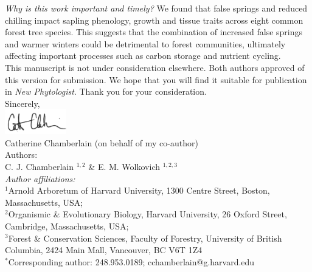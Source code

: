 \documentclass[11pt,a4paper]{article}\usepackage[]{graphicx}\usepackage[]{color}
\begin{document}
\noindent \textit{Why is this work important and timely?} We found that false springs and reduced chilling impact sapling phenology, growth and tissue traits across eight common forest tree species. This suggests that the combination of increased false springs and warmer winters could be detrimental to forest communities, ultimately affecting important processes such as carbon storage and nutrient cycling. \\

\noindent This manuscript is not under consideration elsewhere. Both authors approved of this version for submission. We hope that you will find it suitable for publication in \textit{New Phytologist}. Thank you for your consideration. \\

\vspace{1.5ex}
\noindent Sincerely, \\
\includegraphics[width=0.2\textwidth]{full_signature.jpg} \\
\noindent Catherine Chamberlain (on behalf of my co-author)
\vspace{2ex}\\
\noindent Authors:\\
C. J. Chamberlain $^{1,2}$ \& E. M. Wolkovich $^{1,2,3}$
\vspace{2ex}\\
\emph{Author affiliations:}\\
$^{1}$Arnold Arboretum of Harvard University, 1300 Centre Street, Boston, Massachusetts, USA; \\
$^{2}$Organismic \& Evolutionary Biology, Harvard University, 26 Oxford Street, Cambridge, Massachusetts, USA; \\
$^{3}$Forest \& Conservation Sciences, Faculty of Forestry, University of British Columbia, 2424 Main Mall, Vancouver, BC V6T 1Z4\\
\vspace{2ex}
$^*$Corresponding author: 248.953.0189; cchamberlain@g.harvard.edu\\

%
\end{document}

